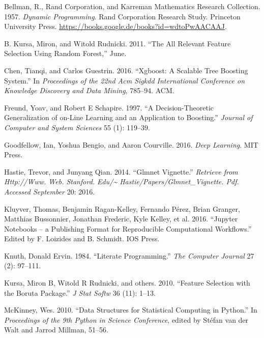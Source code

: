 \documentclass[
  11pt,
  a4paper,
  DIV=12,captions=tableheading,oneside]{scrbook}
\begin{document}
\leavevmode\hypertarget{ref-bellman1957dynamic}{}%
Bellman, R., Rand Corporation, and Karreman Mathematics Research Collection. 1957. \emph{Dynamic Programming}. Rand Corporation Research Study. Princeton University Press. \url{https://books.google.de/books?id=wdtoPwAACAAJ}.

\leavevmode\hypertarget{ref-kursa2011boruta}{}%
B. Kursa, Miron, and Witold Rudnicki. 2011. ``The All Relevant Feature Selection Using Random Forest,'' June.

\leavevmode\hypertarget{ref-chen2016xgboost}{}%
Chen, Tianqi, and Carlos Guestrin. 2016. ``Xgboost: A Scalable Tree Boosting System.'' In \emph{Proceedings of the 22nd Acm Sigkdd International Conference on Knowledge Discovery and Data Mining}, 785--94. ACM.

\leavevmode\hypertarget{ref-freund1997decision}{}%
Freund, Yoav, and Robert E Schapire. 1997. ``A Decision-Theoretic Generalization of on-Line Learning and an Application to Boosting.'' \emph{Journal of Computer and System Sciences} 55 (1): 119--39.

\leavevmode\hypertarget{ref-Goodfellow-et-al-2016}{}%
Goodfellow, Ian, Yoshua Bengio, and Aaron Courville. 2016. \emph{Deep Learning}. MIT Press.

\leavevmode\hypertarget{ref-hastie2014glmnet}{}%
Hastie, Trevor, and Junyang Qian. 2014. ``Glmnet Vignette.'' \emph{Retrieve from Http://Www. Web. Stanford. Edu/\textasciitilde{} Hastie/Papers/Glmnet\_Vignette. Pdf. Accessed September} 20: 2016.

\leavevmode\hypertarget{ref-Kluyver:2016aa}{}%
Kluyver, Thomas, Benjamin Ragan-Kelley, Fernando Pérez, Brian Granger, Matthias Bussonnier, Jonathan Frederic, Kyle Kelley, et al. 2016. ``Jupyter Notebooks -- a Publishing Format for Reproducible Computational Workflows.'' Edited by F. Loizides and B. Schmidt. IOS Press.

\leavevmode\hypertarget{ref-knuth1984literate}{}%
Knuth, Donald Ervin. 1984. ``Literate Programming.'' \emph{The Computer Journal} 27 (2): 97--111.

\leavevmode\hypertarget{ref-kursa2010boruta}{}%
Kursa, Miron B, Witold R Rudnicki, and others. 2010. ``Feature Selection with the Boruta Package.'' \emph{J Stat Softw} 36 (11): 1--13.

\leavevmode\hypertarget{ref-mckinney-proc-scipy-2010}{}%
McKinney, Wes. 2010. ``Data Structures for Statistical Computing in Python.'' In \emph{Proceedings of the 9th Python in Science Conference}, edited by Stéfan van der Walt and Jarrod Millman, 51--56.
\end{document}
